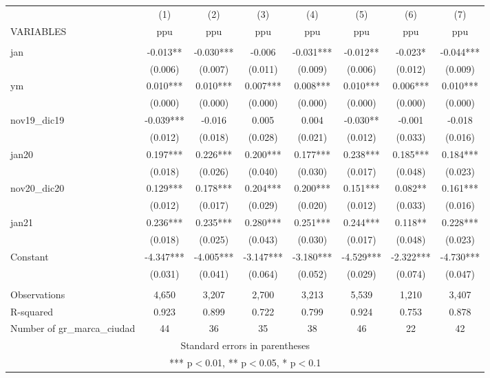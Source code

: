 \begin{tabular}{lccccccc} \hline
 & (1) & (2) & (3) & (4) & (5) & (6) & (7) \\
VARIABLES & ppu & ppu & ppu & ppu & ppu & ppu & ppu \\ \hline
 &  &  &  &  &  &  &  \\
jan & -0.013** & -0.030*** & -0.006 & -0.031*** & -0.012** & -0.023* & -0.044*** \\
 & (0.006) & (0.007) & (0.011) & (0.009) & (0.006) & (0.012) & (0.009) \\
ym & 0.010*** & 0.010*** & 0.007*** & 0.008*** & 0.010*** & 0.006*** & 0.010*** \\
 & (0.000) & (0.000) & (0.000) & (0.000) & (0.000) & (0.000) & (0.000) \\
nov19\_dic19 & -0.039*** & -0.016 & 0.005 & 0.004 & -0.030** & -0.001 & -0.018 \\
 & (0.012) & (0.018) & (0.028) & (0.021) & (0.012) & (0.033) & (0.016) \\
jan20 & 0.197*** & 0.226*** & 0.200*** & 0.177*** & 0.238*** & 0.185*** & 0.184*** \\
 & (0.018) & (0.026) & (0.040) & (0.030) & (0.017) & (0.048) & (0.023) \\
nov20\_dic20 & 0.129*** & 0.178*** & 0.204*** & 0.200*** & 0.151*** & 0.082** & 0.161*** \\
 & (0.012) & (0.017) & (0.029) & (0.020) & (0.012) & (0.033) & (0.016) \\
jan21 & 0.236*** & 0.235*** & 0.280*** & 0.251*** & 0.244*** & 0.118** & 0.228*** \\
 & (0.018) & (0.025) & (0.043) & (0.030) & (0.017) & (0.048) & (0.023) \\
Constant & -4.347*** & -4.005*** & -3.147*** & -3.180*** & -4.529*** & -2.322*** & -4.730*** \\
 & (0.031) & (0.041) & (0.064) & (0.052) & (0.029) & (0.074) & (0.047) \\
 &  &  &  &  &  &  &  \\
Observations & 4,650 & 3,207 & 2,700 & 3,213 & 5,539 & 1,210 & 3,407 \\
R-squared & 0.923 & 0.899 & 0.722 & 0.799 & 0.924 & 0.753 & 0.878 \\
 Number of gr\_marca\_ciudad & 44 & 36 & 35 & 38 & 46 & 22 & 42 \\ \hline
\multicolumn{8}{c}{ Standard errors in parentheses} \\
\multicolumn{8}{c}{ *** p$<$0.01, ** p$<$0.05, * p$<$0.1} \\
\end{tabular}
